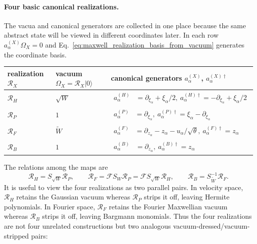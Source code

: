 \documentclass[11pt,oneside]{article}
\numberwithin{equation}{section}
\theoremstyle{definition}
\begin{document}
\paragraph{Four basic canonical realizations.}
The vacua and canonical generators are collected in one place because the same abstract state will be viewed in different coordinates later.  In each row $a^{(X)}_\alpha\Omega_X=0$ and Eq.~\eqref{eq:maxwell_realization_basis_from_vacuum} generates the coordinate basis.
\begin{center}
\small
\renewcommand{\arraystretch}{1.45}
\begin{tabular}{@{}p{} p{} p{}@{}}
\toprule
realization $\mathcal R_X$ & vacuum $\Omega_X=\mathcal R_X|0\rangle$ & canonical generators $a_\alpha^{(X)}$,  $a_\alpha^{(X)\dagger}$ \\
\midrule
$\mathcal R_H$ & $\sqrt W$ &
$\begin{aligned}
a^{(H)}_\alpha&=\partial_{\xi_\alpha}+\xi_\alpha/2,\
a^{(H)\dagger}_\alpha=-\partial_{\xi_\alpha}+\xi_\alpha/2
\end{aligned}$ \\
$\mathcal R_P$ & $1$ &
$\begin{aligned}
a^{(P)}_\alpha&=\partial_{\xi_\alpha},\
a^{(P)\dagger}_\alpha=\xi_\alpha-\partial_{\xi_\alpha}
\end{aligned}$ \\
$\mathcal R_F$ & $\widetilde W$ &
$\begin{aligned}
a^{(F)}_\alpha&=\partial_{z_\alpha}-z_\alpha-u_\alpha/\sqrt\theta,\
a^{(F)\dagger}_\alpha=z_\alpha
\end{aligned}$ \\
$\mathcal R_B$ & $1$ &
$\begin{aligned}
a^{(B)}_\alpha&=\partial_{z_\alpha},\
a^{(B)\dagger}_\alpha=z_\alpha
\end{aligned}$ \\
\bottomrule
\end{tabular}
\end{center}
The relations among the maps are
\begin{equation}
\mathcal R_H=S_{\sqrt W}\mathcal R_P,
\qquad
\mathcal R_F=\mathcal F S_W \mathcal R_P=\mathcal F S_{\sqrt W}\mathcal R_H,
\qquad
\mathcal R_B=S_{\widetilde W}^{-1}\mathcal R_F.
\label{eq:maxwell_four_realization_chain}
\end{equation}
It is useful to view the four realizations as two parallel pairs.  In velocity space, $\mathcal R_H$ retains the Gaussian vacuum whereas $\mathcal R_P$ strips it off, leaving Hermite polynomials.  In Fourier space, $\mathcal R_F$ retains the Fourier Maxwellian vacuum whereas $\mathcal R_B$ strips it off, leaving Bargmann monomials.  Thus the four realizations are not four unrelated constructions but two analogous vacuum-dressed/vacuum-stripped pairs:
\end{document}
